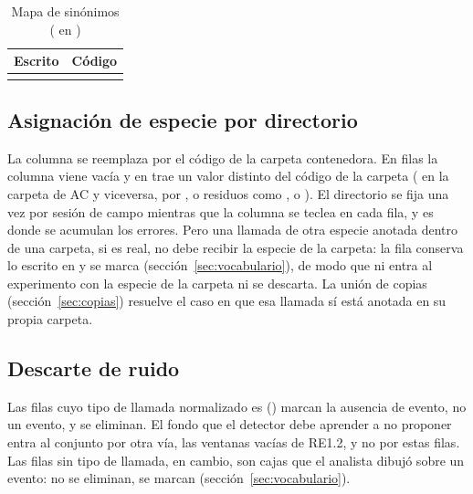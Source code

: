\documentclass[12pt,a4paper]{article}
\begin{document}
\begin{table}[htbp]
    \centering
    \caption{Mapa de sinónimos ( en )}
    \label{tab:sinonimos}
    \small
    \begin{tabular}{@{}ll@{}}
        \toprule
        \textbf{Escrito} & \textbf{Código} \\
        \midrule
         \\
        \bottomrule
    \end{tabular}
\end{table}

\subsection{Asignación de especie por directorio}
\label{sec:especie}

La columna  se reemplaza por el código de la carpeta contenedora. En
\nSpeciesEmpty{} filas la columna viene vacía y en \nSpeciesMismatch{} trae un valor distinto
del código de la carpeta ( en la carpeta de AC y viceversa,  por ,
o residuos como \code{\}},  o ). El directorio se fija
una vez por sesión de campo mientras que la columna se teclea en cada fila, y es donde se
acumulan los errores. Pero una llamada de otra especie anotada dentro de una carpeta, si es
real, no debe recibir la especie de la carpeta: la fila conserva lo escrito en
 y se marca  (sección~\ref{sec:vocabulario}),
de modo que ni entra al experimento con la especie de la carpeta ni se descarta. La unión de
copias (sección~\ref{sec:copias}) resuelve el caso en que esa llamada sí está anotada en su
propia carpeta.

\subsection{Descarte de ruido}

Las filas cuyo tipo de llamada normalizado es  (\nNoise{}) marcan la ausencia de
evento, no un evento, y se eliminan. El fondo que el detector debe aprender a no proponer entra
al conjunto por otra vía, las ventanas vacías de RE1.2, y no por estas filas. Las \nEmptyCall{}
filas sin tipo de llamada, en cambio, son cajas que el analista dibujó sobre un evento: no se
eliminan, se marcan  (sección~\ref{sec:vocabulario}).
\end{document}
